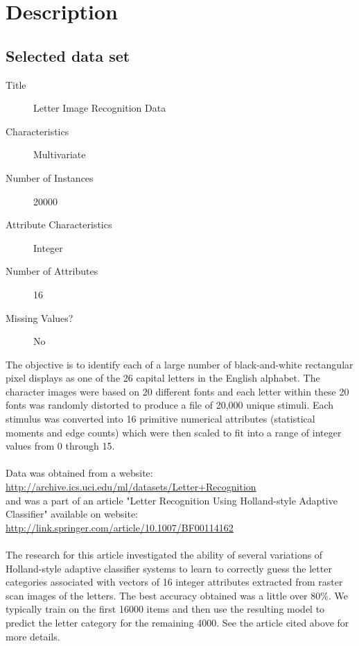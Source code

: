 \chapter*{Description}
\section*{Selected data set}
\begin{description}
\item[Title] Letter Image Recognition Data
\item[Characteristics]  Multivariate
\item[Number of Instances] 20000
\item[Attribute Characteristics] Integer
\item[Number of Attributes] 16
\item[Missing Values?] No
\end{description}

The objective is to identify each of a large number of black-and-white rectangular
pixel displays as one of the 26 capital letters in the English alphabet. The
character images were based on 20 different fonts and each letter within these
20 fonts was randomly distorted to produce a file of 20,000 unique stimuli.
Each stimulus was converted into 16 primitive numerical attributes (statistical
moments and edge counts) which were then scaled to fit into a range of integer
values from 0 through 15. \\
\\
\noindent
Data was obtained from a website: \\
\url{http://archive.ics.uci.edu/ml/datasets/Letter+Recognition} \\
and was a part of an article "Letter Recognition Using Holland-style Adaptive
Classifier" available on website: \\
\url{http://link.springer.com/article/10.1007/BF00114162} \\
\\
\noindent
The research for this article investigated the ability of several
variations of Holland-style adaptive classifier systems to learn to
correctly guess the letter categories associated with vectors of 16
integer attributes extracted from raster scan images of the letters.
The best accuracy obtained was a little over 80\%.
We typically train on the first 16000 items and then use the resulting model
to predict the letter category for the remaining 4000. See the article cited
above for more details.

